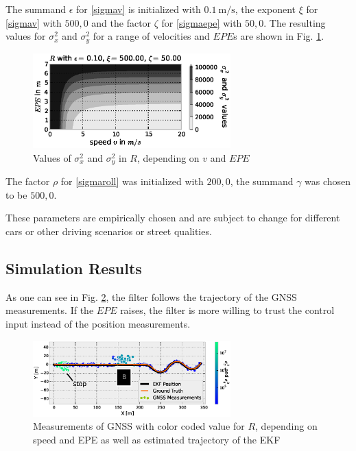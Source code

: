 \documentclass[a4paper,twoside]{article}
\begin{document}
The summand $\epsilon$ for \eqref{sigmav} is initialized with $\SI{0.1}{\metre\per\second}$, the exponent $\xi$ for \eqref{sigmav} with $500{,}0$ and the factor $\zeta$ for \eqref{sigmaepe} with $50{,}0$. The resulting values for $\sigma_x^2$ and $\sigma_y^2$ for a range of velocities and $EPE$s are shown in Fig. \ref{R1}.

\begin{figure}[ht]
\centering
\includegraphics[width=3.0in]{images/R}
\caption{Values of $\sigma_x^2$ and $\sigma_y^2$ in $R$, depending on $v$ and $EPE$}
\label{R1}
\end{figure}

The factor $\rho$ for \eqref{sigmaroll} was initialized with $200{,}0$, the summand $\gamma$ was chosen to be $500{,}0$.

These parameters are empirically chosen and are subject to change for different cars or other driving scenarios or street qualities.

\subsection{Simulation Results}

As one can see in Fig. \ref{CTRV-Position-Testdata}, the filter follows the trajectory of the GNSS measurements. If the $EPE$ raises, the filter is more willing to trust the control input instead of the position measurements.

\begin{figure}[ht]
\centering
\includegraphics[width=3.0in]{images/Extended-Kalman-Filter-CTRV-Position-Testdata}
\caption{Measurements of GNSS with color coded value for $R$, depending on speed and EPE as well as estimated trajectory of the EKF}
\label{CTRV-Position-Testdata}
\end{figure}
\end{document}
